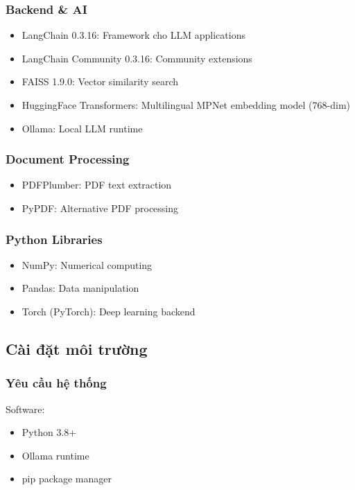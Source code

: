 \documentclass[a4paper]{article}
\begin{document}
\subsubsection{Backend \& AI}
\begin{itemize}
    \item LangChain 0.3.16: Framework cho LLM applications
    \item LangChain Community 0.3.16: Community extensions
    \item FAISS 1.9.0: Vector similarity search
    \item HuggingFace Transformers: Multilingual MPNet embedding model (768-dim)
    \item Ollama: Local LLM runtime
\end{itemize}

\subsubsection{Document Processing}
\begin{itemize}
    \item PDFPlumber: PDF text extraction
    \item PyPDF: Alternative PDF processing
\end{itemize}

\subsubsection{Python Libraries}
\begin{itemize}
    \item NumPy: Numerical computing
    \item Pandas: Data manipulation
    \item Torch (PyTorch): Deep learning backend
\end{itemize}

\subsection{Cài đặt môi trường} %
\subsubsection{Yêu cầu hệ thống}
Software:
\begin{itemize}
    \item Python 3.8+
    \item Ollama runtime
    \item pip package manager
\end{itemize}
\end{document}

